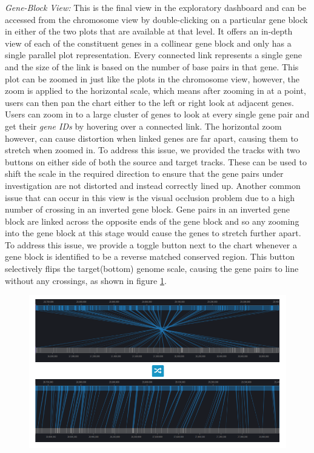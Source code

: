\textit{Gene-Block View:} This is the final view in the exploratory dashboard and can be accessed from the chromosome view by double-clicking on a particular gene block in either of the two plots that are available at that level. It offers an in-depth view of each of the constituent genes in a collinear gene block and only has a single parallel plot representation. Every connected link represents a single gene and the size of the link is based on the number of base pairs in that gene. This plot can be zoomed in just like the plots in the chromosome view, however, the zoom is applied to the horizontal scale, which means after zooming in at a point, users can then pan the chart either to the left or right look at adjacent genes. Users can zoom in to a large cluster of genes to look at every single gene pair and get their \textit{gene IDs} by hovering over a connected link. The horizontal zoom however, can cause distortion when linked genes are far apart, causing them to stretch when zoomed in. To address this issue, we provided the tracks with two buttons on either side of both the source and target tracks. These can be used to shift the scale in the required direction to ensure that the gene pairs under investigation are not distorted and instead correctly lined up. Another common issue that can occur in this view is the visual occlusion problem due to a high number of crossing in an inverted gene block. Gene pairs in an inverted gene block are linked across the opposite ends of the gene block and so any zooming into the gene block at this stage would cause the genes to stretch further apart. To address this issue, we provide a toggle button next to the chart whenever a gene block is identified to be a reverse matched conserved region. This button selectively flips the target(bottom) genome scale, causing the gene pairs to line without any crossings, as shown in figure \ref{fig:ch_5_block_view_invert}. 

\begin{figure}
  \centering
  \includegraphics[width=1\linewidth]{images/ch_5_block_view_invert.PNG}
  \label{fig:ch_5_block_view_invert}
\end{figure} 

